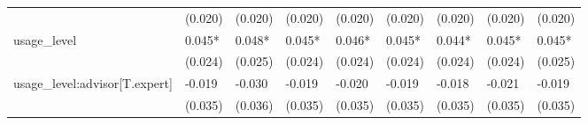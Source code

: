 \begin{table}
\begin{center}
\begin{tabular}{lllllllll}
                                             & (0.020)   & (0.020)   & (0.020)   & (0.020)   & (0.020)   & (0.020)   & (0.020)   & (0.020)   \\
usage\_level                                 & 0.045*    & 0.048*    & 0.045*    & 0.046*    & 0.045*    & 0.044*    & 0.045*    & 0.045*    \\
                                             & (0.024)   & (0.025)   & (0.024)   & (0.024)   & (0.024)   & (0.024)   & (0.024)   & (0.025)   \\
usage\_level:advisor[T.expert]               & -0.019    & -0.030    & -0.019    & -0.020    & -0.019    & -0.018    & -0.021    & -0.019    \\
                                             & (0.035)   & (0.036)   & (0.035)   & (0.035)   & (0.035)   & (0.035)   & (0.035)   & (0.035)   \\
\hline
\end{tabular}
\end{center}
\end{table}